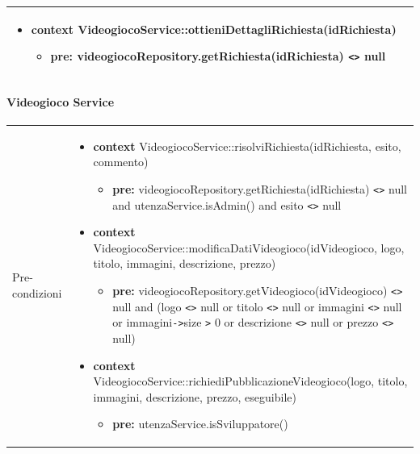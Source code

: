 \begin{tabular}{|| l | p{28em} ||}
\begin{itemize}[leftmargin=*]
		\item \textbf{context} VideogiocoService::\newline ottieniDettagliRichiesta(idRichiesta)
		\begin{itemize}
			\item[ ] \textbf{pre:} videogiocoRepository.getRichiesta(idRichiesta) \verb|<>| null
		\end{itemize}
	\end{itemize}\\
	\hline
\end{tabular}

\newpage
\paragraph{Videogioco Service}
\small\begin{tabular}{|| l | p{28em} ||} 
	\hline
	Pre-condizioni & \begin{itemize}[leftmargin=*]
		\item \textbf{context} VideogiocoService::risolviRichiesta(idRichiesta, esito, commento)
		\begin{itemize}
			\item[ ] \textbf{pre:} videogiocoRepository.getRichiesta(idRichiesta) \verb|<>| null and utenzaService.isAdmin() and esito \verb|<>| null
		\end{itemize}

		\item \textbf{context} VideogiocoService::\newline modificaDatiVideogioco(idVideogioco, logo, titolo, immagini, descrizione, prezzo)
		\begin{itemize}
			\item[ ] \textbf{pre:} videogiocoRepository.getVideogioco(idVideogioco) \verb|<>| null and (logo \verb|<>| null or titolo \verb|<>| null or immagini \verb|<>| null or immagini\verb|->|size \verb|>| 0 or descrizione \verb|<>| null or prezzo \verb|<>| null)
		\end{itemize}

		\item \textbf{context} VideogiocoService::\newline richiediPubblicazioneVideogioco(logo, titolo, immagini, descrizione, prezzo, eseguibile)
		\begin{itemize}
			\item[ ] \textbf{pre:} utenzaService.isSviluppatore()
		\end{itemize}


\end{itemize}
\end{tabular}
